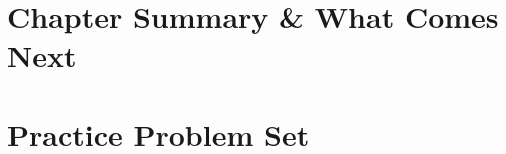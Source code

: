 \clearpage
\section{Chapter Summary \& What Comes Next}
\label{sec:ch1-summary}


\clearpage
\section{Practice Problem Set}
\label{sec:ch1-problems}

\clearpage

